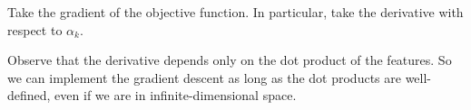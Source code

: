 \documentclass{discussion}
\begin{document}
\begin{exercise}
  Take the gradient of the objective function. In particular, take the derivative with respect to $\alpha_k$.
\end{exercise} 

Observe that the derivative depends only on the dot product of the features. So we can implement the gradient descent as long as the dot products are well-defined, even if we are in infinite-dimensional space.
\end{document}
